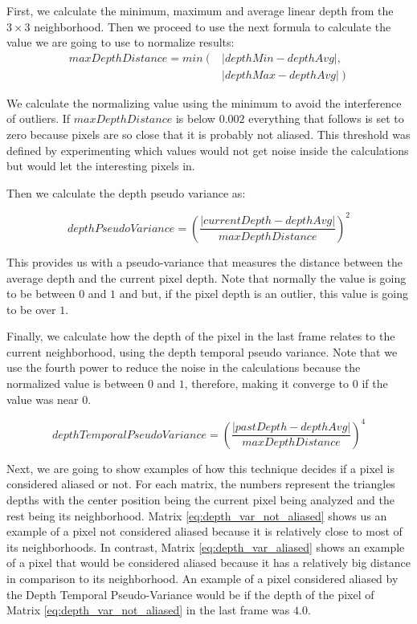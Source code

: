 \documentclass{cslthse-msc}
\begin{document}
First, we calculate the minimum, maximum and average linear depth from the $3\times 3$ neighborhood. Then we proceed to use the next formula to calculate the value we are going to use to normalize results:
\begin{equation} \label{eq:maxdepthdistance}
\begin{split} 
	maxDepthDistance = min \left( \right. & \left| depthMin-depthAvg \right|  ,   \\ 
	 &  \left.\left| depthMax-depthAvg\right| \right) 
\end{split} 
\end{equation}

We calculate the normalizing value using the minimum to avoid the interference of outliers. If $maxDepthDistance$  is below $0.002$ everything that follows is set to zero because pixels are so close that it is probably not aliased. This threshold was defined by experimenting which values would not get noise inside the calculations but would let the interesting pixels in. 

Then we calculate the depth pseudo variance as:

\begin{equation} \label{eq:depthpseudovariance}
	depthPseudoVariance = \left( \frac{\left|currentDepth-depthAvg\right|}{maxDepthDistance}\right)^2
\end{equation}

This provides us with a pseudo-variance that measures the distance between the average depth and the current pixel depth. Note that normally the value is going to be between $0$ and $1$ and but, if the pixel depth is an outlier, this value is going to be over $1$.

Finally, we calculate how the depth of the pixel in the last frame relates to the current neighborhood, using the depth temporal pseudo variance. Note that we use the fourth power to reduce the noise in the calculations because the normalized value is between $0$ and $1$, therefore, making it converge to $0$ if the value was near $0$.

\begin{equation} \label{eq:depthtemporalpseudovariance}
depthTemporalPseudoVariance = \left( \frac{\left|pastDepth-depthAvg\right|}{maxDepthDistance}\right)^4
\end{equation}

Next, we are going to show examples of how this technique decides if a pixel is considered aliased or not. For each matrix, the numbers represent the triangles depths with the center position being the current pixel being analyzed and the rest being its neighborhood.  Matrix \ref{eq:depth_var_not_aliased} shows us an example of a pixel not considered aliased because it is relatively close to most of its neighborhoods. In contrast, Matrix \ref{eq:depth_var_aliased} shows an example of a pixel that would be considered aliased because it has a relatively big distance in comparison to its neighborhood. An example of a pixel considered aliased by the Depth Temporal Pseudo-Variance would be if the depth of the pixel of Matrix  \ref{eq:depth_var_not_aliased} in the last frame was $4.0$.
\end{document}
